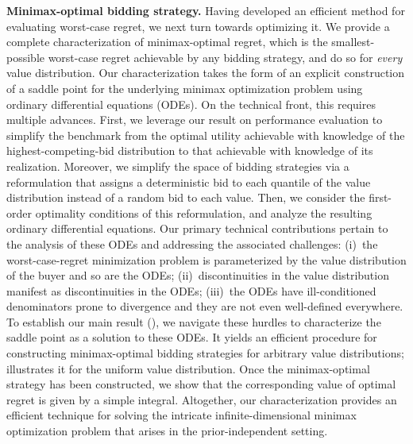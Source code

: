 \textbf{Minimax-optimal bidding strategy.} Having developed an efficient method for evaluating worst-case regret, we next turn towards optimizing it. We provide a complete characterization of minimax-optimal regret, which is the smallest-possible worst-case regret achievable by any bidding strategy, and do so for \emph{every} value distribution. Our characterization takes the form of an explicit construction of a saddle point for the underlying minimax optimization problem using ordinary differential equations (ODEs). On the technical front, this requires multiple advances. First, we leverage our result on performance evaluation to simplify the benchmark from the optimal utility achievable with knowledge of the highest-competing-bid distribution to that achievable with knowledge of its realization. Moreover, we simplify the space of bidding strategies via a reformulation that assigns a deterministic bid to each quantile of the value distribution instead of a random bid to each value. Then, we consider the first-order optimality conditions of this reformulation, and analyze the resulting ordinary differential equations. Our primary technical contributions pertain to the analysis of these ODEs and addressing the associated challenges: (i)~the worst-case-regret minimization problem is parameterized by the value distribution of the buyer and so are the ODEs; (ii)~discontinuities in the value distribution manifest as discontinuities in the ODEs; (iii)~the ODEs have ill-conditioned denominators prone to divergence and they are not even well-defined everywhere. To establish our main result (), we navigate these hurdles to characterize the saddle point as a solution to these ODEs. It yields an efficient procedure for constructing minimax-optimal bidding strategies for arbitrary value distributions;  illustrates it for the uniform value distribution. Once the minimax-optimal strategy has been constructed, we show that the corresponding value of optimal regret is given by a simple integral. Altogether, our characterization provides an efficient technique for solving the intricate infinite-dimensional minimax optimization problem that arises in the prior-independent setting.

